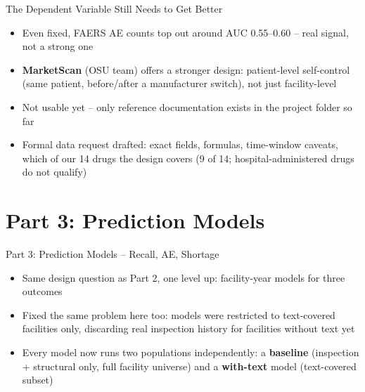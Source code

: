 \documentclass[aspectratio=169,10pt]{beamer}
\newcommand{\tech}[1]{{\color{techBlue}\textbf{#1}}}
\begin{document}
\begin{frame}{The Dependent Variable Still Needs to Get Better}
\begin{itemize}
  \setlength{\itemsep}{10pt}
  \item Even fixed, FAERS AE counts top out around AUC 0.55--0.60 -- real signal,
        not a strong one
  \item \tech{MarketScan} (OSU team) offers a stronger design: patient-level
        self-control (same patient, before/after a manufacturer switch), not just
        facility-level
  \item Not usable yet -- only reference documentation exists in the project
        folder so far
  \item Formal data request drafted: exact fields, formulas, time-window caveats,
        which of our 14 drugs the design covers (9 of 14; hospital-administered
        drugs do not qualify)
\end{itemize}
\end{frame}

\section{Part 3: Prediction Models}

\begin{frame}{Part 3: Prediction Models -- Recall, AE, Shortage}
\begin{itemize}
  \setlength{\itemsep}{10pt}
  \item Same design question as Part 2, one level up: facility-year models for
        three outcomes
  \item Fixed the same problem here too: models were restricted to
        text-covered facilities only, discarding real inspection history for
        facilities without text yet
  \item Every model now runs two populations independently: a
        \textbf{baseline} (inspection + structural only, full facility
        universe) and a \textbf{with-text} model (text-covered subset)
\end{itemize}
\end{frame}
\end{document}
